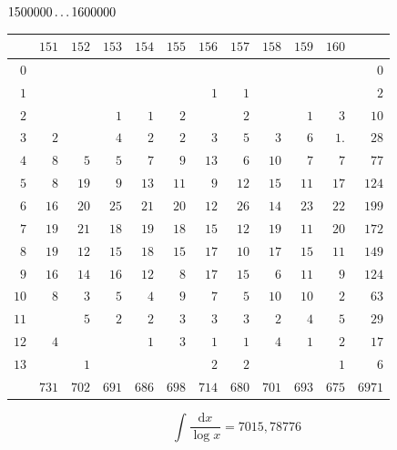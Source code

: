 \par\medskip
\noindent\begin{minipage}{\linewidth}\centering
{}
\(1500000\mathinner{.\,.\,.}1600000\)\par\smallskip
\begingroup\fontsize{10.5}{11.5}\selectfont\setlength{\tabcolsep}{3.5pt}\renewcommand{\arraystretch}{1}
\begin{tabular}{r|rrrrrrrrrr|r}\hline
 & $151$ & $152$ & $153$ & $154$ & $155$ & $156$ & $157$ & $158$ & $159$ & $160$ &  \\ \hline
$0$ &  &  &  &  &  &  &  &  &  &  & $0$ \\
$1$ &  &  &  &  &  & $1$ & $1$ &  &  &  & $2$ \\
$2$ &  &  & $1$ & $1$ & $2$ &  & $2$ &  & $1$ & $3$ & $10$ \\
$3$ & $2$ &  & $4$ & $2$ & $2$ & $3$ & $5$ & $3$ & $6$ & $1\mathord{.}$ & $28$ \\
$4$ & $8$ & $5$ & $5$ & $7$ & $9$ & $13$ & $6$ & $10$ & $7$ & $7$ & $77$ \\
$5$ & $8$ & $19$ & $9$ & $13$ & $11$ & $9$ & $12$ & $15$ & $11$ & $17$ & $124$ \\
$6$ & $16$ & $20$ & $25$ & $21$ & $20$ & $12$ & $26$ & $14$ & $23$ & $22$ & $199$ \\
$7$ & $19$ & $21$ & $18$ & $19$ & $18$ & $15$ & $12$ & $19$ & $11$ & $20$ & $172$ \\
$8$ & $19$ & $12$ & $15$ & $18$ & $15$ & $17$ & $10$ & $17$ & $15$ & $11$ & $149$ \\
$9$ & $16$ & $14$ & $16$ & $12$ & $8$ & $17$ & $15$ & $6$ & $11$ & $9$ & $124$ \\
$10$ & $8$ & $3$ & $5$ & $4$ & $9$ & $7$ & $5$ & $10$ & $10$ & $2$ & $63$ \\
$11$ &  & $5$ & $2$ & $2$ & $3$ & $3$ & $3$ & $2$ & $4$ & $5$ & $29$ \\
$12$ & $4$ &  &  & $1$ & $3$ & $1$ & $1$ & $4$ & $1$ & $2$ & $17$ \\
$13$ &  & $1$ &  &  &  & $2$ & $2$ &  &  & $1$ & $6$ \\
\hline
 & $731$ & $702$ & $691$ & $686$ & $698$ & $714$ & $680$ & $701$ & $693$ & $675$ & $6971$ \\ \hline
\end{tabular}\par\endgroup
\setlength{\abovedisplayskip}{6pt}\setlength{\belowdisplayskip}{4pt}
\[\int\frac{\mathrm{d}x}{\log x}=7015{,}78776\]
\end{minipage}\par

